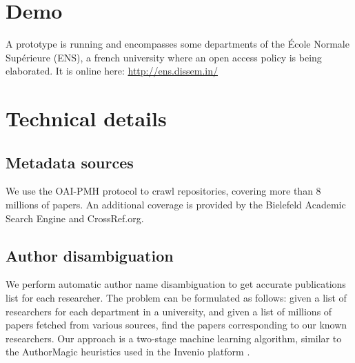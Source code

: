 \documentclass[a4paper]{article}
\begin{document}

\section{Demo}

A prototype is running and encompasses some departments of the École
Normale Supérieure (ENS), a french university where an open access policy
is being elaborated. It is online here:
\url{http://ens.dissem.in/}

\section{Technical details}

\subsection{Metadata sources}

We use the OAI-PMH \cite{oaipmh} protocol to crawl repositories, covering more
than 8 millions of papers. An additional coverage is provided by the Bielefeld
Academic Search Engine \cite{lossau2006bielefeld} and CrossRef.org.

\subsection{Author disambiguation}

We perform automatic author name disambiguation to get accurate
publications list for each researcher. The problem can be formulated as
follows: given a list of researchers for each department in a
university, and given a list of millions of papers fetched from various
sources, find the papers corresponding to our known researchers. Our
approach is a two-stage machine learning algorithm, similar to the AuthorMagic heuristics
used in the Invenio platform \cite{weiler2011authormagic}.



\end{document}
